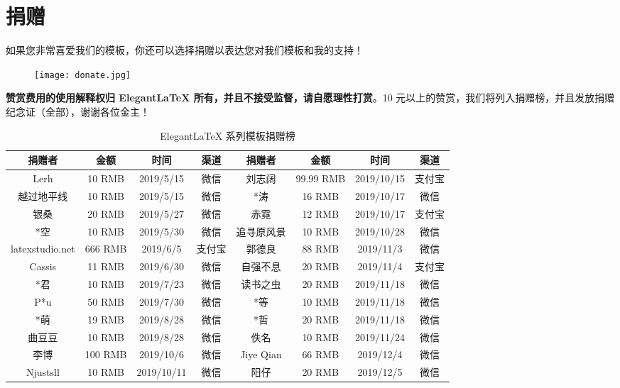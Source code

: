 \documentclass[cn,hazy,blue,screen,14pt]{elegantnote}
\begin{document}
\section{捐赠}

如果您非常喜爱我们的模板，你还可以选择捐赠以表达您对我们模板和我的支持！

\begin{figure}[htbp]
  \centering
  \texttt{[image: donate.jpg]}
\end{figure}

\textbf{赞赏费用的使用解释权归 Elegant\LaTeX{} 所有，并且不接受监督，请自愿理性打赏}。10 元以上的赞赏，我们将列入捐赠榜，并且发放捐赠纪念证（全部），谢谢各位金主！

\begin{table}[htbp]
  \centering
  \caption{Elegant\LaTeX{} 系列模板捐赠榜}
    \begin{tabular}{cccccccc}
    \toprule
    \textbf{捐赠者} & \textbf{金额} & \textbf{时间} & \textbf{渠道} & \textbf{捐赠者} & \textbf{金额} & \textbf{时间} & \textbf{渠道} \\
    \midrule
    Lerh  & 10 RMB & 2019/5/15 & 微信    & 刘志阔   & 99.99 RMB & 2019/10/15 & 支付宝 \\
    越过地平线 & 10 RMB & 2019/5/15 & 微信    & *涛    & 16 RMB & 2019/10/17 & 微信 \\
    银桑    & 20 RMB & 2019/5/27 & 微信    & 赤霓    & 12 RMB & 2019/10/17 & 支付宝 \\
    *空    & 10 RMB & 2019/5/30 & 微信    & 追寻原风景 & 10 RMB & 2019/10/28 & 微信 \\
    latexstudio.net & 666 RMB & 2019/6/5 & 支付宝   & 郭德良   & 88 RMB & 2019/11/3 & 微信 \\
    Cassis & 11 RMB & 2019/6/30 & 微信    & 自强不息  & 20 RMB & 2019/11/4 & 支付宝 \\
    *君    & 10 RMB & 2019/7/23 & 微信    & 读书之虫  & 20 RMB & 2019/11/18 & 微信 \\
    P*u   & 50 RMB & 2019/7/30 & 微信    & *等    & 10 RMB & 2019/11/18 & 微信 \\
    *萌    & 19 RMB & 2019/8/28 & 微信    & *哲    & 20 RMB & 2019/11/18 & 微信 \\
    曲豆豆   & 10 RMB & 2019/8/28 & 微信    & 佚名    & 10 RMB & 2019/11/24 & 微信 \\
    李博    & 100 RMB & 2019/10/6 & 微信    & Jiye Qian & 66 RMB & 2019/12/4 & 微信 \\
    Njustsll & 10 RMB & 2019/10/11 & 微信    & 阳仔    & 20 RMB & 2019/12/5 & 微信 \\
    \bottomrule
    \end{tabular}%
  \label{tab:donation}%
\end{table}%
\end{document}
